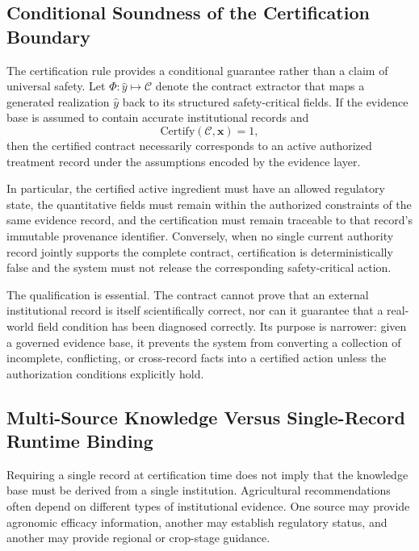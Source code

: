 \documentclass[a4paper,fleqn]{cas-dc}
\begin{document}
\subsection{Conditional Soundness of the Certification Boundary}

The certification rule provides a conditional guarantee rather than a claim of universal safety. Let $\Phi: \hat{y} \mapsto \mathcal{C}$ denote the contract extractor that maps a generated realization $\hat{y}$ back to its structured safety-critical fields. If the evidence base is assumed to contain accurate institutional records and
\begin{equation}
\mathrm{Certify}(\mathcal{C},\mathbf{x})=1,
\end{equation}
then the certified contract necessarily corresponds to an active authorized treatment record under the assumptions encoded by the evidence layer.

In particular, the certified active ingredient must have an allowed regulatory state, the quantitative fields must remain within the authorized constraints of the same evidence record, and the certification must remain traceable to that record's immutable provenance identifier. Conversely, when no single current authority record jointly supports the complete contract, certification is deterministically false and the system must not release the corresponding safety-critical action.

The qualification is essential. The contract cannot prove that an external institutional record is itself scientifically correct, nor can it guarantee that a real-world field condition has been diagnosed correctly. Its purpose is narrower: given a governed evidence base, it prevents the system from converting a collection of incomplete, conflicting, or cross-record facts into a certified action unless the authorization conditions explicitly hold.

\subsection{Multi-Source Knowledge Versus Single-Record Runtime Binding}

Requiring a single record at certification time does not imply that the knowledge base must be derived from a single institution. Agricultural recommendations often depend on different types of institutional evidence. One source may provide agronomic efficacy information, another may establish regulatory status, and another may provide regional or crop-stage guidance.
\end{document}
